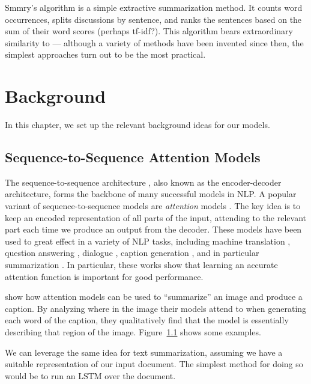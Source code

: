 \documentclass[11pt]{report}
\begin{document}
Smmry's algorithm is a simple extractive summarization method. It counts word occurrences, splits discussions by sentence, and ranks the sentences based on the sum of their word scores (perhaps tf-idf?). This algorithm bears extraordinary similarity to \citet{luhn1958automatic} --- although a variety of methods have been invented since then, the simplest approaches turn out to be the most practical.


\chapter{Background}

In this chapter, we set up the relevant background ideas for our models.

\section{Sequence-to-Sequence Attention Models}

The sequence-to-sequence architecture \citep{sutskever2014sequence}, also known as the encoder-decoder architecture, forms the backbone of many successful models in NLP. A popular variant of sequence-to-sequence models are \emph{attention} models \citep{bahdanau2014neural}. The key idea is to keep an encoded representation of all parts of the input, attending to the relevant part each time we produce an output from the decoder.
These models have been used to great effect in a variety of NLP tasks, including machine translation \citep{sutskever2014sequence, bahdanau2014neural}, question answering \citep{Hermann2015}, dialogue \citep{li2016persona}, caption generation \citep{xu2015captioning}, and in particular summarization \citep{rush2015neural}. In particular, these works show that learning an accurate attention function is important for good performance. %

\citet{xu2015captioning} show how attention models can be used to ``summarize'' an image and produce a caption. 
By analyzing where in the image their models attend to when generating each word of the caption, they qualitatively find that the model is essentially describing that region of the image. 
Figure~\ref{fig:caption} shows some examples.

\begin{figure}
\label{fig:caption}
\end{figure}

We can leverage the same idea for text summarization, assuming we have a suitable representation of our input document. The simplest method for doing so would be to run an LSTM over the document.
\end{document}
